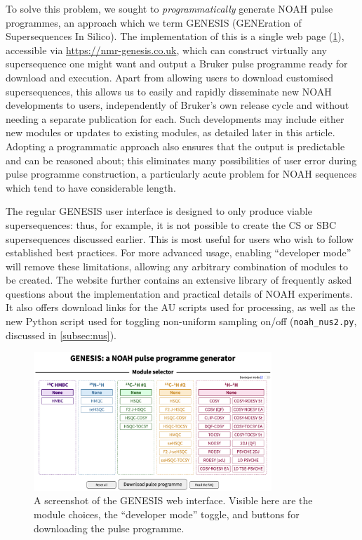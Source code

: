 \documentclass[a4paper,11pt]{article}
\newcommand{\theurl}{\url{https://nmr-genesis.co.uk}}
\begin{document}
\begin{refsection}
To solve this problem, we sought to \textit{programmatically} generate NOAH pulse programmes, an approach which we term GENESIS (GENEration of Supersequences In Silico).
The implementation of this is a single web page (\cref{fig:screenshot}), accessible via \theurl{}, which can construct virtually any supersequence one might want and output a Bruker pulse programme ready for download and execution.
Apart from allowing users to download customised supersequences, this allows us to easily and rapidly disseminate new NOAH developments to users, independently of Bruker's own release cycle and without needing a separate publication for each.
Such developments may include either new modules or updates to existing modules, as detailed later in this article.
Adopting a programmatic approach also ensures that the output is predictable and can be reasoned about; this eliminates many possibilities of user error during pulse programme construction, a particularly acute problem for NOAH sequences which tend to have considerable length.

The regular GENESIS user interface is designed to only produce viable supersequences: thus, for example, it is not possible to create the CS or SBC supersequences discussed earlier.
This is most useful for users who wish to follow established best practices.
For more advanced usage, enabling ``developer mode'' will remove these limitations, allowing any arbitrary combination of modules to be created.
The website further contains an extensive library of frequently asked questions about the implementation and practical details of NOAH experiments.
It also offers download links for the AU scripts used for processing, as well as the new Python script used for toggling non-uniform sampling on/off (\texttt{noah\_nus2.py}, discussed in \cref{subsec:nus}).


\begin{figure}
    \centering
    \includegraphics[width=0.8\textwidth]{screenshot.png}
    \caption{
        A screenshot of the GENESIS web interface.
        Visible here are the module choices, the ``developer mode'' toggle, and buttons for downloading the pulse programme.
    }
    \label{fig:screenshot}
\end{figure}


\end{refsection}
\end{document}
